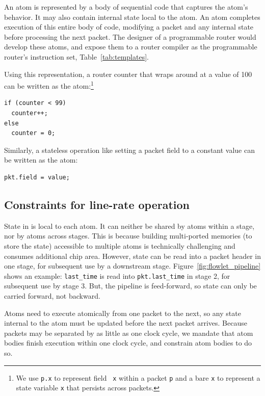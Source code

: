 An atom is represented by a body of sequential code that captures the atom's
behavior. It may also contain internal state local to the atom. An atom
completes execution of this entire body of code, modifying a packet and any
internal state before processing the next packet. The designer of a
programmable router would develop these atoms, and expose them to a router
compiler as the programmable router's instruction set, \eg
Table~\ref{tab:templates}.

Using this representation, a router counter that wraps around at a value of 100
can be written as the atom:\footnote{We use {\tt p.x} to represent field {\tt
x} within a packet {\tt p} and a bare {\tt x} to represent a state variable
{\tt x} that persists across packets.}
\begin{lstlisting}[style=customc, numbers=none, frame=none]
if (counter < 99)
  counter++;
else
  counter = 0;
\end{lstlisting}

Similarly, a stateless operation like setting a packet field to a constant
value can be written as the atom:
\begin{lstlisting}[style=customc, numbers=none, frame=none]
  pkt.field = value;
\end{lstlisting}

\subsection{Constraints for line-rate operation}
\label{s:atomConstraints}

 State in \absmachine is local to each atom.  It can
neither be shared by atoms within a stage, nor by atoms across stages. This is
because building multi-ported memories (to store the state) accessible to
multiple atoms is technically challenging and consumes additional chip area.
However, state can be read into a packet header in one stage, for subsequent
use by a downstream stage. Figure~\ref{fig:flowlet_pipeline} shows an example:
{\tt last\_time} is read into {\tt pkt.last\_time} in stage 2, for subsequent
use by stage 3.  But, the \absmachine pipeline is feed-forward, so state can
only be carried forward, not backward.

 Atoms need to execute atomically from one
packet to the next, so any state internal to the atom must be updated before
the next packet arrives.  Because packets may be separated by as little as one
clock cycle, we mandate that atom bodies finish execution within one clock
cycle, and constrain atom bodies to do so.

